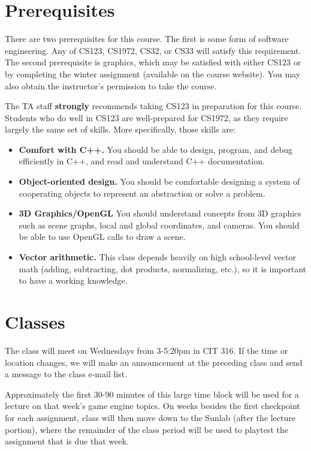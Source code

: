 \documentclass{cs1972}
\begin{document}
 \section*{Prerequisites}
 There are two prerequisites for this course. The first is some form of software engineering. Any of CS123, CS1972, CS32, or CS33 will satisfy this requirement. The second prerequisite is graphics, which may be satisfied with either CS123 or by completing the winter assignment (available on the course website). You may also obtain the instructor's permission to take the course. 
 
 The TA staff \textbf{strongly} recommends taking CS123 in preparation for this course. Students who do well in CS123 are well-prepared for CS1972, as they require largely the same set of skills. More specifically, those skills are:
 
 \begin{itemize}
  \item \textbf{Comfort with C++.} You should be able to design, program, and debug efficiently in C++, and read and understand C++ documentation.
  \item \textbf{Object-oriented design.} You should be comfortable designing a system of cooperating objects to represent an abstraction or solve a problem.
  \item \textbf{3D Graphics/OpenGL} You should understand concepts from 3D graphics such as scene graphs, local and global coordinates, and cameras. You should be able to use OpenGL calls to draw a scene.
  \item \textbf{Vector arithmetic.} This class depends heavily on high school-level vector math (adding, subtracting, dot products, normalizing, etc.), so it is important to have a working knowledge. 
 \end{itemize}
 
 \section*{Classes}
 The class will meet on Wednesdays from 3-5:20pm in CIT 316. If the time or location changes, we will make an announcement at the preceding class and send a message to the class e-mail list.
 
 Approximately the first 30-90 minutes of this large time block will be used for a lecture on that week's game engine topics. On weeks besides the first checkpoint for each assignment, class will then move down to the Sunlab (after the lecture portion), where the remainder of the class period will be used to playtest the assignment that is due that week. 
 
\end{document}
